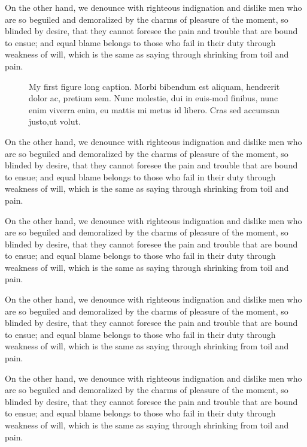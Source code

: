 On the other hand, we denounce with righteous indignation and dislike men who
are so beguiled and demoralized by the charms of pleasure of the moment, so
blinded by desire, that they cannot foresee the pain and trouble that are bound
to ensue; and equal blame belongs to those who fail in their duty through
weakness of will, which is the same as saying through shrinking from toil and
pain.


\begin{figure}[htbp]
  \centering
  
  \caption[My first figure short caption]{My first figure long caption. Morbi
    bibendum est aliquam, hendrerit dolor ac, pretium sem. Nunc molestie, dui in
    euis-mod finibus, nunc enim viverra enim, eu mattis mi metus id libero. Cras
    sed accumsan justo,ut volut.}
  \label{fig:label}
\end{figure}


On the other hand, we denounce with righteous indignation and dislike men who
are so beguiled and demoralized by the charms of pleasure of the moment, so
blinded by desire, that they cannot foresee the pain and trouble that are bound
to ensue; and equal blame belongs to those who fail in their duty through
weakness of will, which is the same as saying through shrinking from toil and
pain.

On the other hand, we denounce with righteous indignation and dislike men who
are so beguiled and demoralized by the charms of pleasure of the moment, so
blinded by desire, that they cannot foresee the pain and trouble that are bound
to ensue; and equal blame belongs to those who fail in their duty through
weakness of will, which is the same as saying through shrinking from toil and
pain.

On the other hand, we denounce with righteous indignation and dislike men who
are so beguiled and demoralized by the charms of pleasure of the moment, so
blinded by desire, that they cannot foresee the pain and trouble that are bound
to ensue; and equal blame belongs to those who fail in their duty through
weakness of will, which is the same as saying through shrinking from toil and
pain.

On the other hand, we denounce with righteous indignation and dislike men who
are so beguiled and demoralized by the charms of pleasure of the moment, so
blinded by desire, that they cannot foresee the pain and trouble that are bound
to ensue; and equal blame belongs to those who fail in their duty through
weakness of will, which is the same as saying through shrinking from toil and
pain.


